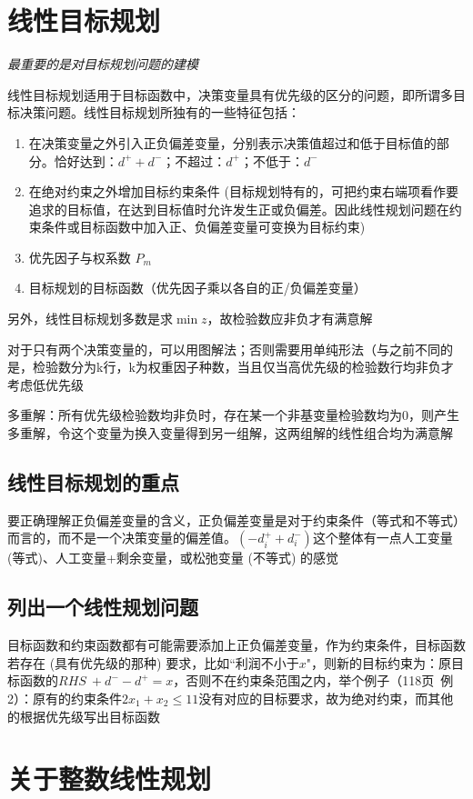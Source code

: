 \documentclass[]{report}
\begin{document}
	\section{线性目标规划}
		\textit{最重要的是对目标规划问题的建模}\par
		线性目标规划适用于目标函数中，决策变量具有优先级的区分的问题，即所谓多目标决策问题。线性目标规划所独有的一些特征包括：\par
		\begin{enumerate}
			\item 在决策变量之外引入正负偏差变量，分别表示决策值超过和低于目标值的部分。恰好达到：$d^++d^-$；不超过：$d^+$；不低于：$d^-$
			\item 在绝对约束之外增加目标约束条件 (目标规划特有的，可把约束右端项看作要追求的目标值，在达到目标值时允许发生正或负偏差。因此线性规划问题在约束条件或目标函数中加入正、负偏差变量可变换为目标约束)
			\item 优先因子与权系数 $P_m$
			\item 目标规划的目标函数（优先因子乘以各自的正/负偏差变量）
		\end{enumerate}\par
		另外，线性目标规划多数是求$\min z$，故检验数应非负才有满意解\par
		对于只有两个决策变量的，可以用图解法；否则需要用单纯形法（与之前不同的是，检验数分为k行，k为权重因子种数，当且仅当高优先级的检验数行均非负才考虑低优先级\par
		多重解：所有优先级检验数均非负时，存在某一个非基变量检验数均为0，则产生多重解，令这个变量为换入变量得到另一组解，这两组解的线性组合均为满意解
		\subsection{线性目标规划的重点}
		要正确理解正负偏差变量的含义，正负偏差变量是对于约束条件（等式和不等式）而言的，而不是一个决策变量的偏差值。$(-d_i^++d_i^-)$这个整体有一点人工变量 (等式)、人工变量+剩余变量，或松弛变量 (不等式) 的感觉
		\subsection{列出一个线性规划问题}
		目标函数和约束函数都有可能需要添加上正负偏差变量，作为约束条件，目标函数若存在 (具有优先级的那种) 要求，比如“利润不小于$x$"，则新的目标约束为：原目标函数的$RHS\ +d^--d^+=x$，否则不在约束条范围之内，举个例子（118页\  例2）：原有的约束条件$2x_1+x_2\le11$没有对应的目标要求，故为绝对约束，而其他的根据优先级写出目标函数
	\section{关于整数线性规划}
\end{document}
